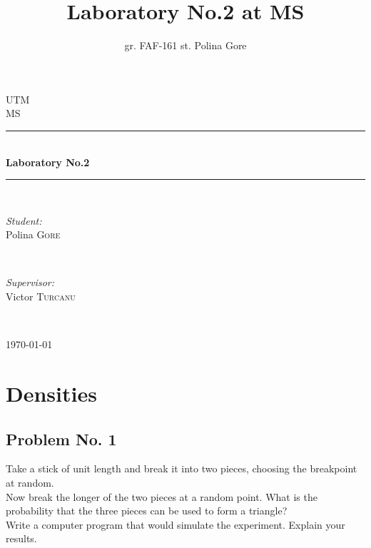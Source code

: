 \documentclass{article}
\title{Laboratory No.2 at MS}
\author{gr. FAF-161 st. Polina Gore}
\begin{document}
  \begin{titlepage}

    \newcommand{\HRule}{\rule{\linewidth}{0.5mm}} %

    \center %

    \textsc{\LARGE UTM}\\[1.5cm] %
    \textsc{\Large MS}\\[0.5cm] %

    \HRule \\[0.4cm]
    { \huge \bfseries Laboratory No.2}\\[0.4cm] %
    \HRule \\[1.5cm]

    \begin{minipage}{0.4\textwidth}
      \begin{flushleft} \large
        \emph{Student:}\\
        Polina \textsc{Gore} %
      \end{flushleft}
    \end{minipage}
    ~
    \begin{minipage}{0.4\textwidth}
      \begin{flushright} \large
        \emph{Supervisor:} \\
        Victor \textsc{Turcanu} %
      \end{flushright}
    \end{minipage}\\[4cm]

    \vfill

    {\large \today}\\[3cm]

  \end{titlepage}


  \newpage

  \section{Densities}

    \subsection{Problem No. 1}

    Take a stick of unit length and break it into two pieces, choosing the
    breakpoint at random.\\
    Now break the longer of the two pieces at a random point.
    What is the probability that the three pieces can be used to form a triangle?\\
    Write a computer program that would simulate the experiment. Explain your results.
\end{document}
